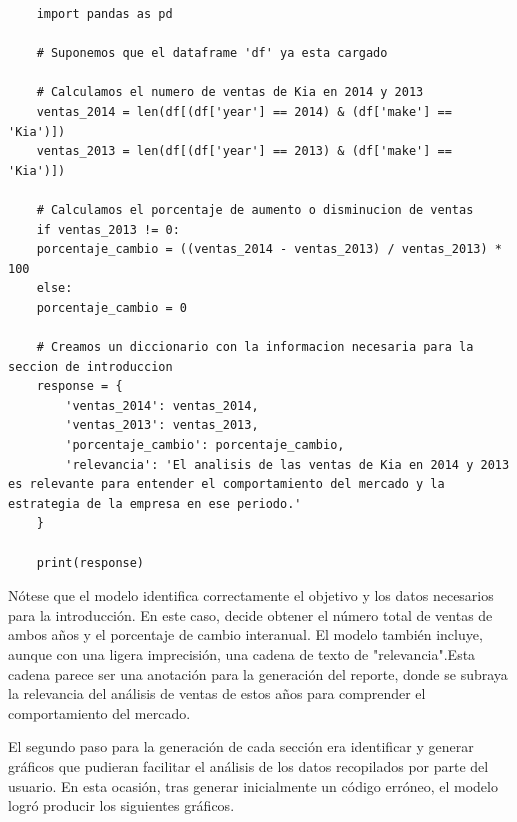 \begin{lstlisting}
	import pandas as pd
	
	# Suponemos que el dataframe 'df' ya esta cargado
	
	# Calculamos el numero de ventas de Kia en 2014 y 2013
	ventas_2014 = len(df[(df['year'] == 2014) & (df['make'] == 'Kia')])
	ventas_2013 = len(df[(df['year'] == 2013) & (df['make'] == 'Kia')])
	
	# Calculamos el porcentaje de aumento o disminucion de ventas
	if ventas_2013 != 0:
	porcentaje_cambio = ((ventas_2014 - ventas_2013) / ventas_2013) * 100
	else:
	porcentaje_cambio = 0
	
	# Creamos un diccionario con la informacion necesaria para la seccion de introduccion
	response = {
		'ventas_2014': ventas_2014,
		'ventas_2013': ventas_2013,
		'porcentaje_cambio': porcentaje_cambio,
		'relevancia': 'El analisis de las ventas de Kia en 2014 y 2013 es relevante para entender el comportamiento del mercado y la estrategia de la empresa en ese periodo.'
	}
	
	print(response)
\end{lstlisting}

Nótese que el modelo identifica correctamente el objetivo y los datos necesarios para la introducción.  En este caso, decide obtener el número total de ventas de ambos años y el porcentaje de cambio interanual. El modelo también incluye, aunque con una ligera imprecisión, una cadena de texto de "relevancia".Esta cadena parece ser una anotación para la generación del reporte, donde se subraya la relevancia del análisis de ventas de estos años para comprender el comportamiento del mercado.

El segundo paso para la generación de cada sección era identificar y generar gráficos que pudieran facilitar el análisis de los datos recopilados por parte del usuario. En esta ocasión, tras generar inicialmente un código erróneo, el modelo logró producir los siguientes gráficos.

